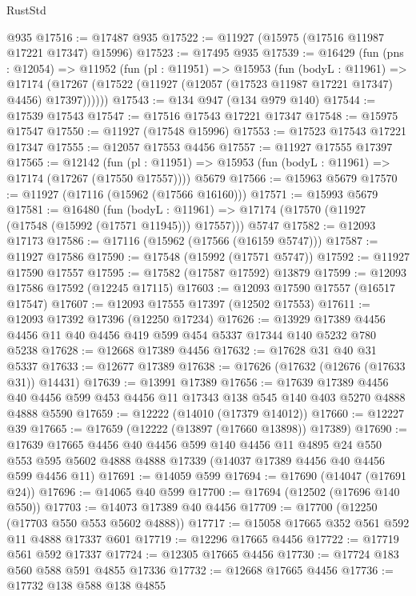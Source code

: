 \begin{lexlean}{RustStd}
\begin{coremodule}
    @935
@17516 := @17487 @935
@17522 := @11927 (@15975 (@17516 @11987 @17221 @17347) @15996)
@17523 := @17495 @935
@17539 := @16429
    (fun (pns : @12054) =>
    @11952
      (fun (pl : @11951) =>
      @15953
        (fun (bodyL : @11961) =>
        @17174 (@17267 (@17522 (@11927 (@12057 (@17523 @11987 @17221 @17347) @4456) @17397))))))
@17543 := @134 @947 (@134 @979 @140)
@17544 := @17539 @17543
@17547 := @17516 @17543 @17221 @17347
@17548 := @15975 @17547
@17550 := @11927 (@17548 @15996)
@17553 := @17523 @17543 @17221 @17347
@17555 := @12057 @17553 @4456
@17557 := @11927 @17555 @17397
@17565 := @12142
    (fun (pl : @11951) => @15953 (fun (bodyL : @11961) => @17174 (@17267 (@17550 @17557))))
    @5679
@17566 := @15963 @5679
@17570 := @11927 (@17116 (@15962 (@17566 @16160)))
@17571 := @15993 @5679
@17581 := @16480
    (fun (bodyL : @11961) => @17174 (@17570 (@11927 (@17548 (@15992 (@17571 @11945))) @17557)))
    @5747
@17582 := @12093 @17173
@17586 := @17116 (@15962 (@17566 (@16159 @5747)))
@17587 := @11927 @17586
@17590 := @17548 (@15992 (@17571 @5747))
@17592 := @11927 @17590 @17557
@17595 := @17582 (@17587 @17592) @13879
@17599 := @12093 @17586 @17592 (@12245 @17115)
@17603 := @12093 @17590 @17557 (@16517 @17547)
@17607 := @12093 @17555 @17397 (@12502 @17553)
@17611 := @12093 @17392 @17396 (@12250 @17234)
@17626 := @13929 @17389 @4456 @4456 @11 @40 @4456 @419 @599 @454 @5337 @17344 @140 @5232 @780 @5238
@17628 := @12668 @17389 @4456
@17632 := @17628 @31 @40 @31 @5337
@17633 := @12677 @17389
@17638 := @17626 (@17632 (@12676 (@17633 @31)) @14431)
@17639 := @13991 @17389
@17656 := @17639
    @17389
    @4456
    @40
    @4456
    @599
    @453
    @4456
    @11
    @17343
    @138
    @545
    @140
    @403
    @5270
    @4888
    @4888
    @5590
@17659 := @12222 (@14010 (@17379 @14012))
@17660 := @12227 @39
@17665 := @17659 (@12222 (@13897 (@17660 @13898)) @17389)
@17690 := @17639
    @17665
    @4456
    @40
    @4456
    @599
    @140
    @4456
    @11
    @4895
    @24
    @550
    @553
    @595
    @5602
    @4888
    @4888
    @17339
    (@14037 @17389 @4456 @40 @4456 @599 @4456 @11)
@17691 := @14059 @599
@17694 := @17690 (@14047 (@17691 @24))
@17696 := @14065 @40 @599
@17700 := @17694 (@12502 (@17696 @140 @550))
@17703 := @14073 @17389 @40 @4456
@17709 := @17700 (@12250 (@17703 @550 @553 @5602 @4888))
@17717 := @15058 @17665 @352 @561 @592 @11 @4888 @17337 @601
@17719 := @12296 @17665 @4456
@17722 := @17719 @561 @592 @17337
@17724 := @12305 @17665 @4456
@17730 := @17724 @183 @560 @588 @591 @4855 @17336
@17732 := @12668 @17665 @4456
@17736 := @17732 @138 @588 @138 @4855

\end{coremodule}
\end{lexlean}
